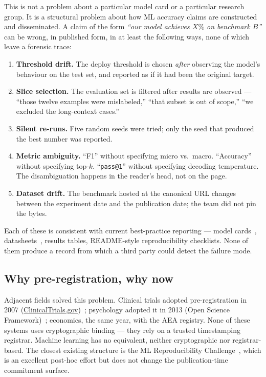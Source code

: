 \documentclass[11pt, a4paper]{article}
\begin{document}
This is not a problem about a particular model card or a particular research group. It is a structural problem about how ML accuracy claims are constructed and disseminated. A claim of the form \emph{``our model achieves $X\%$ on benchmark $B$''} can be wrong, in published form, in at least the following ways, none of which leave a forensic trace:

\begin{enumerate}[leftmargin=2em, itemsep=0.3em]
  \item \textbf{Threshold drift.} The deploy threshold is chosen \emph{after} observing the model's behaviour on the test set, and reported as if it had been the original target.
  \item \textbf{Slice selection.} The evaluation set is filtered after results are observed --- ``those twelve examples were mislabeled,'' ``that subset is out of scope,'' ``we excluded the long-context cases.''
  \item \textbf{Silent re-runs.} Five random seeds were tried; only the seed that produced the best number was reported.
  \item \textbf{Metric ambiguity.} ``F1'' without specifying micro vs.\ macro. ``Accuracy'' without specifying top-$k$. ``\texttt{pass@1}'' without specifying decoding temperature. The disambiguation happens in the reader's head, not on the page.
  \item \textbf{Dataset drift.} The benchmark hosted at the canonical URL changes between the experiment date and the publication date; the team did not pin the bytes.
\end{enumerate}

Each of these is consistent with current best-practice reporting --- model cards~\cite{mitchell2019modelcards}, datasheets~\cite{gebru2018datasheets}, results tables, README-style reproducibility checklists. None of them produce a record from which a third party could detect the failure mode.

\subsection{Why pre-registration, why now}

Adjacent fields solved this problem. Clinical trials adopted pre-registration in 2007 (\href{https://clinicaltrials.gov}{ClinicalTrials.gov})~\cite{zarin2011clinicaltrials}; psychology adopted it in 2013 (Open Science Framework)~\cite{nosek2018preregistration, chambers2013registered}; economics, the same year, with the AEA registry. None of these systems uses cryptographic binding --- they rely on a trusted timestamping registrar. Machine learning has no equivalent, neither cryptographic nor registrar-based. The closest existing structure is the ML Reproducibility Challenge~\cite{pineau2021reproducibility}, which is an excellent post-hoc effort but does not change the publication-time commitment surface.
\end{document}
